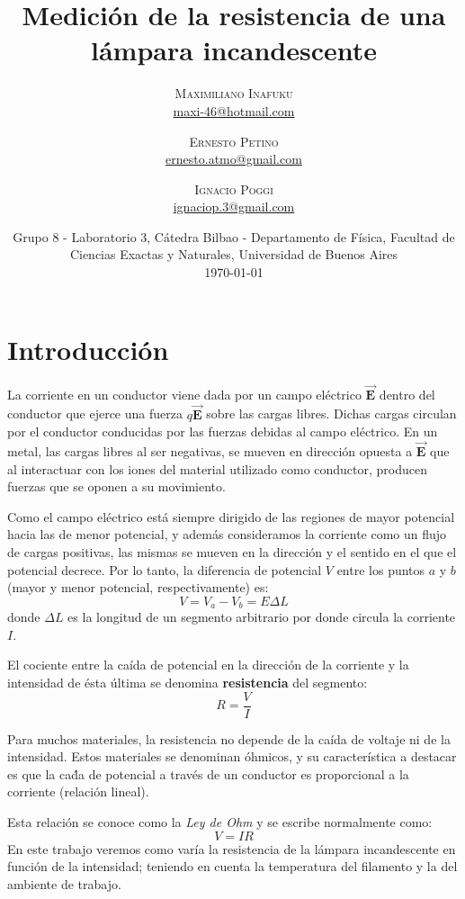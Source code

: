 \documentclass[twoside,twocolumn,a4paper]{article}
\title{Medici\'on de la resistencia de una l\'ampara incandescente} %
\author{%
\textsc{Maximiliano Inafuku} \\[1ex] %
\normalsize \href{mailto:maxi-46@hotmail.com}{maxi-46@hotmail.com} %
\and %
\textsc{Ernesto Petino} \\[1ex] %
\normalsize \href{mailto:ernesto.atmo@gmail.com}{ernesto.atmo@gmail.com} %
\and %
\textsc{Ignacio Poggi} \\[1ex] %
\normalsize \href{mailto:ignaciop.3@gmail.com}{ignaciop.3@gmail.com} %
}
\date{Grupo 8 - Laboratorio 3, C\'atedra Bilbao - Departamento de F\'isica, Facultad de Ciencias Exactas y Naturales, Universidad de Buenos Aires \newline \\ \today} %
\begin{document}
\maketitle


\section{Introducci\'on}

La corriente en un conductor viene dada por un campo el\'ectrico $\mathbf{\vec{E}}$ dentro del conductor que ejerce una fuerza $q\mathbf{\vec{E}}$ sobre las cargas libres. Dichas cargas circulan por el conductor conducidas por las fuerzas debidas al campo el\'ectrico. En un metal, las cargas libres al ser negativas, se mueven en direcci\'on opuesta a $\mathbf{\vec{E}}$ que al interactuar con los iones del material utilizado como conductor, producen fuerzas que se oponen a su movimiento.\par
Como el campo el\'ectrico est\'a siempre dirigido de las regiones de mayor potencial hacia las de menor potencial, y adem\'as consideramos la corriente como un flujo de cargas positivas, las mismas se mueven en la direcci\'on y el sentido en el que el potencial decrece. Por lo tanto, la diferencia de potencial $V$ entre los puntos $a$ y $b$ (mayor y menor potencial, respectivamente) es:
\begin{equation}
\label{eq:potencial}
V = V_{a} - V_{b} = E\Delta L
\end{equation}
donde $\Delta L$ es la longitud de un segmento arbitrario por donde circula la corriente $I$.
\par El cociente entre la ca\'ida de potencial en la direcci\'on de la corriente y la intensidad de \'esta \'ultima se denomina \textbf{resistencia} del segmento:
\begin{equation}
\label{eq:ohm1}
R = \frac{V}{I}
\end{equation}
\par Para muchos materiales, la resistencia no depende de la ca\'ida de voltaje ni de la intensidad. Estos materiales se denominan  \'ohmicos, y su caracter\'istica a destacar es que la ca\'da de potencial a trav\'es de un conductor es proporcional a la corriente (relaci\'on lineal).
\par Esta relaci\'on se conoce como la \textit{Ley de Ohm} y se escribe normalmente como:
\begin{equation}
\label{eq:ohm2}
V = IR
\end{equation}
En este trabajo veremos como var\'ia la resistencia de la l\'ampara incandescente en funci\'on de la intensidad; teniendo en cuenta la temperatura del filamento y la del ambiente de trabajo.
\end{document}
